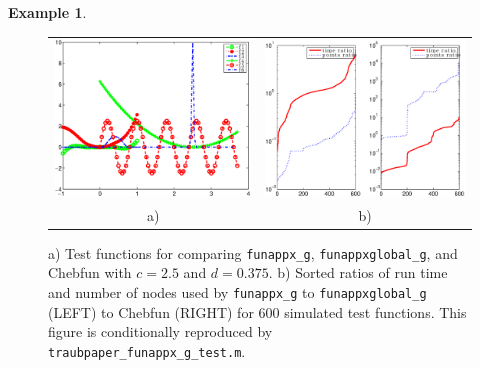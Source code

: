 \documentclass[review]{elsarticle}
\theoremstyle{definition}
\newtheorem{exmp}{Example}
\newcommand{\funappxg}{\texttt{funappx\_g\xspace}}
\newcommand{\funappxglobalg}{\texttt{funappxglobal\_g\xspace}}
\begin{document}
\begin{exmp}
%
\begin{figure}[th]
  \centering
  \begin{tabular}{cc}
\includegraphics[width=59mm]{figure/traub_funappxNoPenalty_g_testfun.eps} & \hspace{-3ex}
\includegraphics[width=60mm]{figure/traub_funappxNoPenalty_g_test}
  \\ a)  & b) 
  \end{tabular}
\caption{a) Test functions for comparing \funappxg, \funappxglobalg, and Chebfun
with $c=2.5$ and $d=0.375$. b) Sorted ratios of run time and number of nodes
used by \funappxg{} to \funappxglobalg{} (LEFT) to Chebfun (RIGHT) for 600 simulated test
functions. This figure is conditionally reproduced by
\texttt{traubpaper\_funappx\_g\_test.m}.}
  \label{fig:testfunctions}
\end{figure}


\end{exmp}
\end{document}
